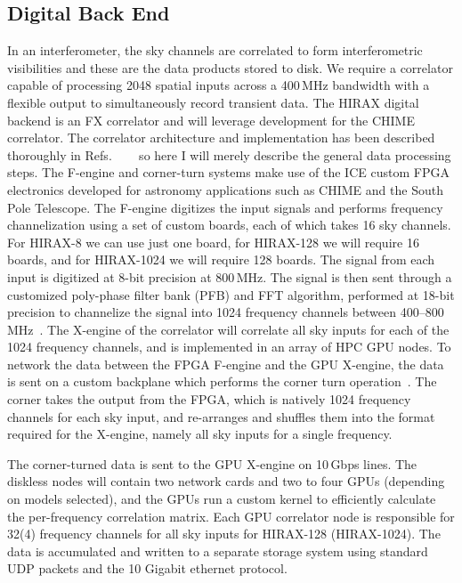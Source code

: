 \documentclass[]{spie}  %
\begin{document}
\subsection{Digital Back End}

In an interferometer, the sky channels are correlated to form interferometric visibilities and these are the data products stored to disk. We require a correlator capable of processing 2048 spatial inputs across a 400\,MHz bandwidth with a flexible output to simultaneously record transient data. The HIRAX digital backend is an FX correlator and will leverage development for the CHIME correlator. The correlator architecture and implementation has been described thoroughly in Refs. ~\cite{2015arXiv150306202D}~\cite{2015arXiv150306203K}~\cite{2015arXiv150306189R} so here I will merely describe the general data processing steps. The F-engine and corner-turn systems make use of the ICE custom FPGA electronics developed for astronomy applications such as CHIME and the South Pole Telescope. The F-engine digitizes the input signals and performs frequency channelization using a set of custom boards, each of which takes 16 sky channels. For HIRAX-8 we can use just one board, for HIRAX-128 we will require 16 boards, and for HIRAX-1024 we will require 128 boards. The signal from each input is digitized at 8-bit precision at 800\,MHz. The signal is then sent through a customized poly-phase filter bank (PFB) and FFT algorithm, performed at 18-bit precision to channelize the signal into 1024 frequency channels between 400--800\,MHz~\cite{ICEboard}. The X-engine of the correlator will correlate all sky inputs for each of the 1024 frequency channels, and is implemented in an array of HPC GPU nodes. To network the data between the FPGA F-engine and the GPU X-engine, the data is sent on a custom backplane which performs the corner turn operation~\cite{Fullmesh}. The corner takes the output from the FPGA, which is natively 1024 frequency channels for each sky input, and re-arranges and shuffles them into the format required for the X-engine, namely all sky inputs for a single frequency. \newline

The corner-turned data is sent to the GPU X-engine on 10\,Gbps lines. The diskless nodes will contain two network cards and two to four GPUs (depending on models selected), and the GPUs run a custom kernel to efficiently calculate the per-frequency correlation matrix. Each GPU correlator node is responsible for 32(4) frequency channels for all sky inputs for HIRAX-128 (HIRAX-1024). The data is accumulated and written to a separate storage system using standard UDP packets and the 10 Gigabit ethernet protocol. \newline
\end{document}
